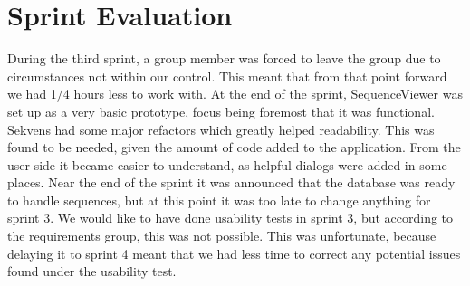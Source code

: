\section{Sprint Evaluation}
During the third sprint, a group member was forced to leave the group due to circumstances not within our control. This meant that from that point forward we had 1/4 hours less to work with. At the end of the sprint, SequenceViewer was set up as a very basic prototype, focus being foremost that it was functional. Sekvens had some major refactors which greatly helped readability. This was found to be needed, given the amount of code added to the application. From the user-side it became easier to understand, as helpful dialogs were added in some places.
Near the end of the sprint it was announced that the database was ready to handle sequences, but at this point it was too late to change anything for sprint 3.
We would like to have done usability tests in sprint 3, but according to the requirements group, this was not possible. This was unfortunate, because delaying it to sprint 4 meant that we had less time to correct any potential issues found under the usability test. 